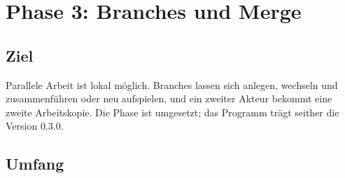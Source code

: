 \chapter[chap:phase3]{Phase 3: Branches und Merge}

\section{Ziel}

Parallele Arbeit ist lokal möglich. Branches lassen sich anlegen, wechseln und zusammenführen
oder neu aufspielen, und ein zweiter Akteur bekommt eine zweite Arbeitskopie.
Die Phase ist umgesetzt; das Programm trägt seither die Version 0.3.0.

\section{Umfang}

